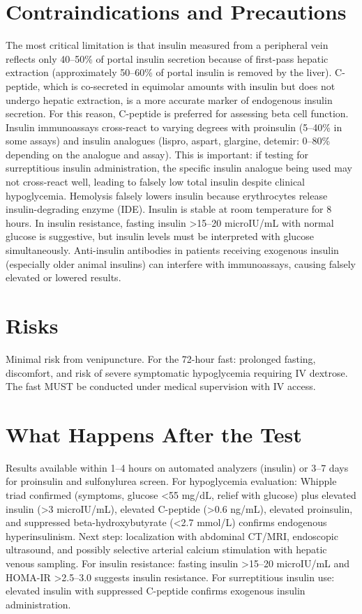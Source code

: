 \section*{Contraindications and Precautions}
The most critical limitation is that insulin measured from a peripheral vein reflects only 40--50\% of portal insulin secretion because of first-pass hepatic extraction (approximately 50--60\% of portal insulin is removed by the liver). C-peptide, which is co-secreted in equimolar amounts with insulin but does not undergo hepatic extraction, is a more accurate marker of endogenous insulin secretion. For this reason, C-peptide is preferred for assessing beta cell function. Insulin immunoassays cross-react to varying degrees with proinsulin (5--40\% in some assays) and insulin analogues (lispro, aspart, glargine, detemir: 0--80\% depending on the analogue and assay). This is important: if testing for surreptitious insulin administration, the specific insulin analogue being used may not cross-react well, leading to falsely low total insulin despite clinical hypoglycemia. Hemolysis falsely lowers insulin because erythrocytes release insulin-degrading enzyme (IDE). Insulin is stable at room temperature for 8 hours. In insulin resistance, fasting insulin >15--20 microIU/mL with normal glucose is suggestive, but insulin levels must be interpreted with glucose simultaneously. Anti-insulin antibodies in patients receiving exogenous insulin (especially older animal insulins) can interfere with immunoassays, causing falsely elevated or lowered results.

\section*{Risks}
Minimal risk from venipuncture. For the 72-hour fast: prolonged fasting, discomfort, and risk of severe symptomatic hypoglycemia requiring IV dextrose. The fast MUST be conducted under medical supervision with IV access.

\section*{What Happens After the Test}
Results available within 1--4 hours on automated analyzers (insulin) or 3--7 days for proinsulin and sulfonylurea screen. For hypoglycemia evaluation: Whipple triad confirmed (symptoms, glucose <55 mg/dL, relief with glucose) plus elevated insulin (>3 microIU/mL), elevated C-peptide (>0.6 ng/mL), elevated proinsulin, and suppressed beta-hydroxybutyrate (<2.7 mmol/L) confirms endogenous hyperinsulinism. Next step: localization with abdominal CT/MRI, endoscopic ultrasound, and possibly selective arterial calcium stimulation with hepatic venous sampling. For insulin resistance: fasting insulin >15--20 microIU/mL and HOMA-IR >2.5--3.0 suggests insulin resistance. For surreptitious insulin use: elevated insulin with suppressed C-peptide confirms exogenous insulin administration.

